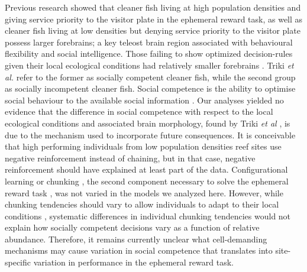 \documentclass[]{rsos}%
\begin{document}
Previous research showed that cleaner fish living at high population
densities and giving service priority to the visitor plate in the
ephemeral reward task, as well as cleaner fish living at low
densities but denying service priority to the visitor plate possess
larger forebrains; a key teleost brain region associated with
behavioural flexibility and social intelligence. Those failing to
show optimized decision-rules given their local ecological
conditions had relatively smaller forebrains \citep{triki_Brain_2020}.
Triki \emph{et al.} refer to the former as socially competent cleaner fish,
while the second group as socially incompetent cleaner fish.
Social competence is the ability to optimise social behaviour
to the available social information \citep{taborsky_Social_2012, bshary_Cooperation_2015, varela_Correlated_2020}. Our analyses yielded no
evidence that the difference in social competence with respect to the local
ecological conditions and associated brain morphology,
found by Triki \emph{et al} \citep{triki_Brain_2020}, is due to the mechanism
used to incorporate future consequences. It is conceivable that
high performing individuals from low population densities reef sites
use negative reinforcement instead of chaining, but in that
case, negative reinforcement should have explained at least
part of the data. Configurational learning or
chunking \citep{sutherland_Configural_1989, miller_Magical_1956},
the second component necessary to solve the ephemeral
reward task \citep{quinones_Reinforcement_2019}, was
not varied in the models we analyzed here. However, while chunking tendencies
should vary to allow individuals to adapt to their local conditions
\citep{prat_Modelling_2022, kolodny_Evolution_2014}, systematic differences
in individual chunking tendencies would not explain how socially
competent decisions vary as a function of relative abundance.
Therefore, it remains currently unclear what cell-demanding
mechanisms may cause variation in social competence that
translates into site-specific variation in performance in the
ephemeral reward task.
\end{document}
